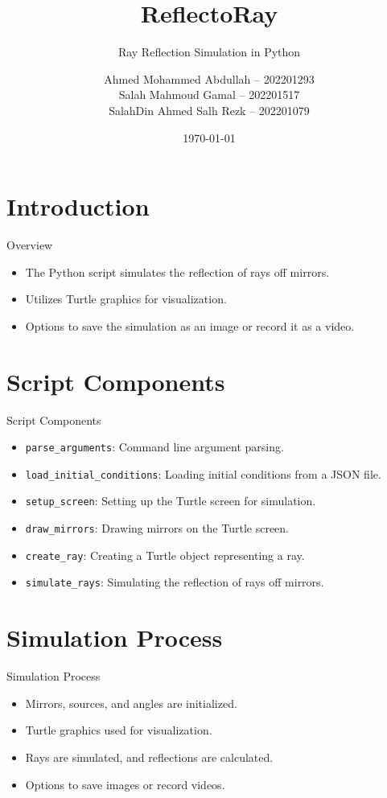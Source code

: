 \documentclass[aspectratio=169, 10pt]{beamer}
\title{ReflectoRay}
\subtitle{Ray Reflection Simulation in Python}
\author{
Ahmed Mohammed Abdullah -- 202201293 \\
Salah Mahmoud Gamal -- 202201517 \\
SalahDin Ahmed Salh Rezk -- 202201079 \\
}
\date{\today}
\begin{document}
\maketitle

\section{Introduction}
\begin{frame}{Overview}
  \begin{itemize}
    \item The Python script simulates the reflection of rays off mirrors.
    \item Utilizes Turtle graphics for visualization.
    \item Options to save the simulation as an image or record it as a video.
  \end{itemize}
\end{frame}

\section{Script Components}
\begin{frame}{Script Components}
  \begin{itemize}
    \item \texttt{parse\_arguments}: Command line argument parsing.
    \item \texttt{load\_initial\_conditions}: Loading initial conditions from a JSON file.
    \item \texttt{setup\_screen}: Setting up the Turtle screen for simulation.
    \item \texttt{draw\_mirrors}: Drawing mirrors on the Turtle screen.
    \item \texttt{create\_ray}: Creating a Turtle object representing a ray.
    \item \texttt{simulate\_rays}: Simulating the reflection of rays off mirrors.
  \end{itemize}
\end{frame}

\section{Simulation Process}
\begin{frame}{Simulation Process}
  \begin{itemize}
    \item Mirrors, sources, and angles are initialized.
    \item Turtle graphics used for visualization.
    \item Rays are simulated, and reflections are calculated.
    \item Options to save images or record videos.
  \end{itemize}
\end{frame}
\end{document}

